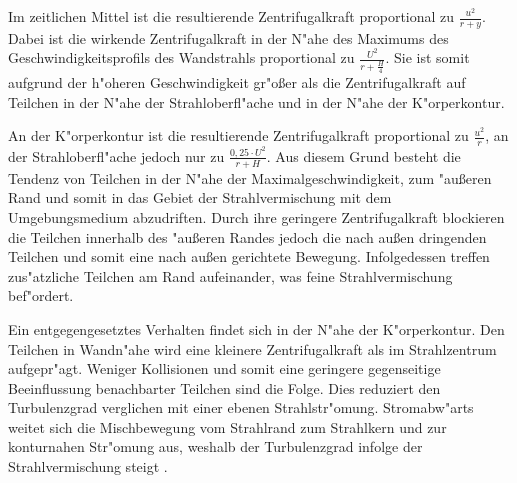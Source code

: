 

Im zeitlichen Mittel ist die resultierende Zentrifugalkraft proportional zu $\frac{u^2}{r+y}$. Dabei ist die wirkende Zentrifugalkraft in der N"ahe des Maximums des Geschwindigkeitsprofils des Wandstrahls proportional zu $\frac{U^2}{r+\frac{H}{4}}$. Sie ist somit aufgrund der h"oheren Geschwindigkeit gr"o\ss{}er als die Zentrifugalkraft auf Teilchen in der N"ahe der Strahloberfl"ache und in der N"ahe der K"orperkontur.


An der K"orperkontur ist die resultierende Zentrifugalkraft proportional zu $\frac{u^2}{r}$, an der Strahloberfl"ache jedoch nur zu $\frac{0,25 \cdot U^2}{r + H}$. Aus diesem Grund besteht die Tendenz von Teilchen in der N"ahe der Maximalgeschwindigkeit, zum "au\ss{}eren Rand und somit in das Gebiet der Strahlvermischung mit dem Umgebungsmedium abzudriften. Durch ihre geringere Zentrifugalkraft blockieren die Teilchen innerhalb des "au\ss{}eren Randes jedoch die nach au\ss{}en dringenden Teilchen und somit eine nach au\ss{}en gerichtete Bewegung. Infolgedessen treffen zus"atzliche Teilchen am Rand aufeinander, was feine Strahlvermischung bef"ordert.

Ein entgegengesetztes Verhalten findet sich in der N"ahe der K"orperkontur. Den Teilchen in Wandn"ahe wird eine kleinere Zentrifugalkraft als im Strahlzentrum aufgepr"agt. Weniger Kollisionen und somit eine geringere gegenseitige Beeinflussung benachbarter Teilchen sind die Folge. Dies reduziert den Turbulenzgrad verglichen mit einer ebenen Strahlstr"omung.
Stromabw"arts weitet sich die Mischbewegung vom Strahlrand zum Strahlkern und zur konturnahen Str"omung aus, weshalb der Turbulenzgrad infolge der Strahlvermischung steigt \cite{Riedel.1973}. 

